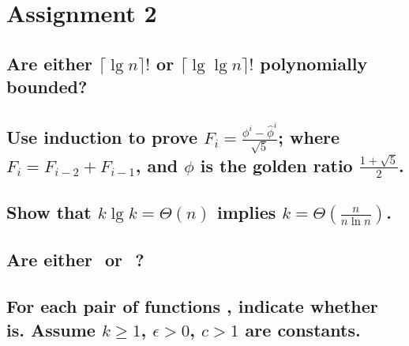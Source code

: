 \chapter{Assignment 2}

\section[Problem 1]{Are either $\lceil \lg n \rceil!$ or $\lceil \lg \lg n \rceil!$ polynomially bounded?}
\section[Problem 2]{Use induction to prove $F_i = \frac{\phi^i - \hat{\phi}^i}{\sqrt{5}}$; where $F_i = F_{i-2} + F_{i-1}$, and $\phi$ is the golden ratio $\frac{1 + \sqrt{5}}{2}$.}
\section[Problem 3]{Show that $k \lg k = \Theta(n)$ implies $k = \Theta\left(\frac{n}{n \ln n}\right)$.}
\section[Problem 4]{Are either $ $ or $ $ $ $?}
\section[Problem 5]{For each pair of functions $ $, indicate whether $ $ is. Assume $k \geq 1$, $\epsilon > 0$, $c > 1$ are constants.}
\section[Problem 6]{}
